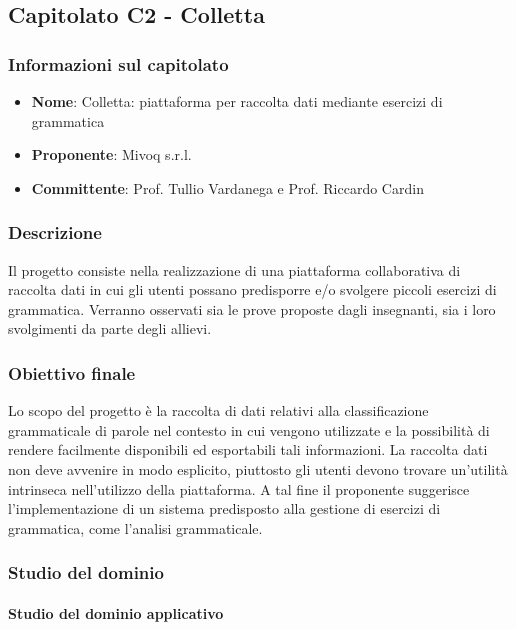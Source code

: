 \subsection{Capitolato C2 - Colletta}
\subsubsection{Informazioni sul capitolato}
\begin{itemize}
	\item \textbf{Nome}: Colletta: piattaforma per raccolta dati
	mediante esercizi di grammatica
	\item \textbf{Proponente}: Mivoq s.r.l.
	\item \textbf{Committente}: Prof. Tullio Vardanega e Prof. Riccardo Cardin
\end{itemize}
\subsubsection{Descrizione}

Il progetto consiste nella realizzazione di una piattaforma collaborativa di raccolta dati in cui gli utenti possano predisporre e/o svolgere piccoli esercizi di grammatica. Verranno osservati sia le prove proposte dagli insegnanti, sia i loro svolgimenti da parte degli allievi.
\subsubsection{Obiettivo finale}

Lo scopo del progetto è la raccolta di dati relativi alla classificazione grammaticale di parole nel contesto in cui vengono utilizzate e la possibilità di rendere facilmente disponibili ed esportabili tali informazioni. La raccolta dati non deve avvenire in modo esplicito, piuttosto gli utenti devono trovare un'utilità intrinseca nell'utilizzo della piattaforma. A tal fine il proponente suggerisce l'implementazione di un sistema predisposto alla gestione di esercizi di grammatica, come l'analisi grammaticale. 
\subsubsection{Studio del dominio}
\paragraph{Studio del dominio applicativo}

